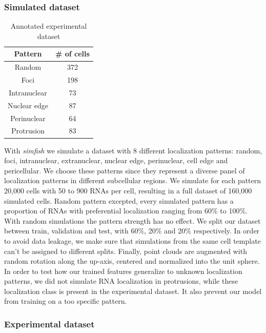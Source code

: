 \subsubsection{Simulated dataset}

\begin{table}
	\centering
	\begin{tabular}{| c | c |}
		\hline
		Pattern & \# of cells \\
		\hline
		Random & 372\\
		Foci & 198\\
		Intranuclear & 73\\
		Nuclear edge & 87\\
		Perinuclear & 64\\
		Protrusion & 83\\
		\hline
	\end{tabular}
	\caption{Annotated experimental dataset}
	\label{table:real_dataset}
\end{table}

With \emph{simfish} we simulate a dataset with 8 different localization patterns: random, foci, intranuclear, extranuclear, nuclear edge, perinuclear, cell edge and pericellular.
We choose these patterns since they represent a diverse panel of localization patterns in different subcellular regions.
We simulate for each pattern 20,000 cells with 50 to 900 \ac{RNA}s per cell, resulting in a full dataset of 160,000 simulated cells.
Random pattern excepted, every simulated pattern has a proportion of \ac{RNA}s with preferential localization ranging from 60\% to 100\%.
With random simulations the pattern strength has no effect.
We split our dataset between train, validation and test, with 60\%, 20\% and 20\% respectively.
In order to avoid data leakage, we make sure that simulations from the same cell template can't be assigned to different splits.
Finally, point clouds are augmented with random rotation along the up-axis, centered and normalized into the unit sphere.
In order to test how our trained features generalize to unknown localization patterns, we did not simulate \ac{RNA} localization in protrusions, while these localization class is present in the experimental dataset.
It also prevent our model from training on a too specific pattern.

\subsubsection{Experimental dataset}

